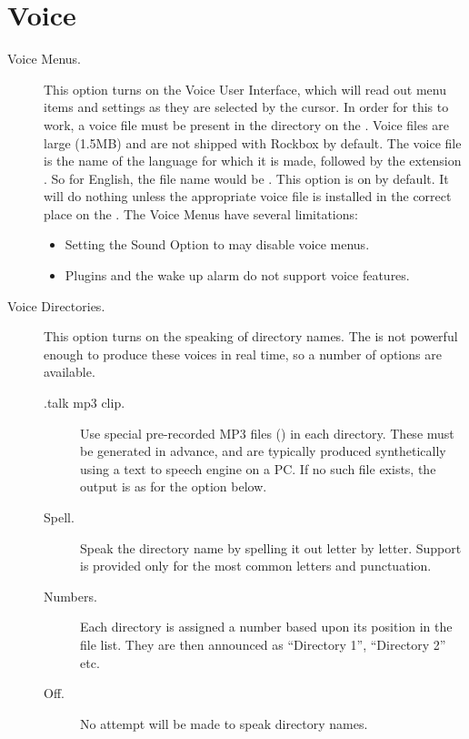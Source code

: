 \section{\label{ref:Voiceconfiguration}Voice}

  \begin{description}
  \item[Voice Menus.]
    This option turns on the Voice User Interface, which will read out menu
    items and settings as they are selected by the cursor.  In order for this
    to work, a voice file must be present in the 
    directory on the \dap.  Voice files are large (1.5MB) and are not 
    shipped with Rockbox by default.
    The voice file is the name of the language for which it is made, followed
    by the extension .  So for English, the file name would be 
    .
    This option is on by default.  It will do nothing unless the 
    appropriate voice file is installed in the correct place on the \dap.
    The Voice Menus have several limitations:
    \begin{itemize}
    \item Setting the Sound Option  to  may 
      disable voice menus.
    \item Plugins and the wake up alarm do not support voice features.
    \end{itemize}

  \item[Voice Directories.]
    This option turns on the speaking of directory names.  The \dap{} 
    is not powerful enough to produce these voices in real time, so a number 
    of options are available.
    \begin{description}
    \item[.talk mp3 clip.]
      Use special pre-recorded MP3 files () in each 
      directory.  These must be generated in advance, and are typically 
      produced synthetically using a text to speech engine on a PC.
      If no such file exists, the output is as for the 
      option below.
    \item[Spell.]
      Speak the directory name by spelling it out letter by letter.  Support
      is provided only for the most common letters and punctuation.
    \item[Numbers.]
      Each directory is assigned a number based upon its position in the
      file list.  They are then announced as ``Directory 1'', ``Directory 2''
      etc.
    \item[Off.]
      No attempt will be made to speak directory names.
    \end{description}


\end{description}
